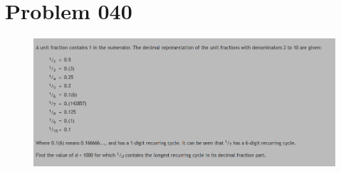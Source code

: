 \section{Problem 040}
\begin{prob}
	\begin{figure}[htb!]
		\begin{center}
			\includegraphics[scale = 0.4]{pic/026.png}
		\end{center}
	\end{figure}
\end{prob}